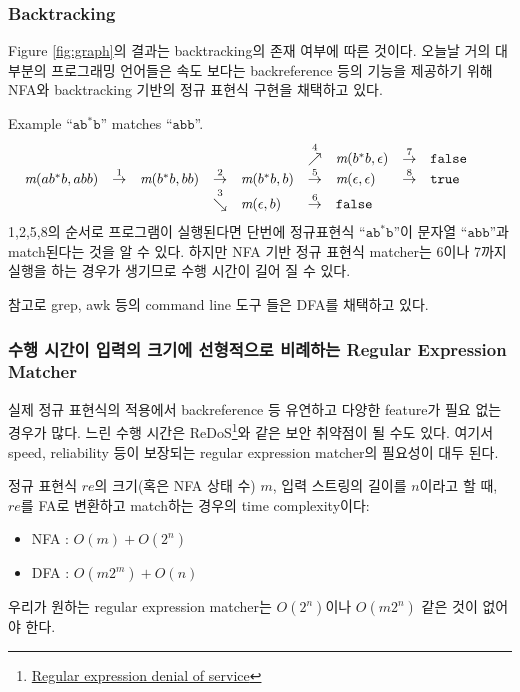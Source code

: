 \begin{frame}[shrink]
\frametitle{Backtracking}

Figure \ref{fig:graph}의 결과는 backtracking의 존재 여부에 따른 것이다.
오늘날 거의 대부분의 프로그래밍 언어들은 속도 보다는 backreference 등의 기능을 
제공하기 위해 NFA와 backtracking 기반의 정규 표현식 구현을 채택하고
있다.

\begin{block}{Example}
``$\texttt{ab}^{*}\texttt{b}$'' matches ``$\texttt{abb}$''.
\[
  \begin{array}{lllllllllll}
    &   &             &         &             &\stackrel{4}{\nearrow} &
    \rmatch{\e}{b^{*}b}&\stackrel{7}{\ra}& \F &  \\
    \rmatch{abb}{ab^{*}b} &\stackrel{1}{\ra}& \rmatch{bb}{b^{*}b} & \stackrel{2}{\ra}
    & \rmatch{b}{b^{*}b} &\stackrel{5}{\ra}     & \rmatch{\e}{\e}
    &\stackrel{8}{\ra}& \T &  \\
    &   &             & \stackrel{3}{\searrow} & \rmatch{b}{\e}
    &\stackrel{6}{\ra}     & \F  & &  & &   
  \end{array}
\]
1,2,5,8의 순서로 프로그램이 실행된다면 단번에 
정규표현식 ``$\texttt{ab}^{*}\texttt{b}$''이 문자열  ``$\texttt{abb}$''과
match된다는 것을 알 수 있다. 하지만 NFA 기반 정규 표현식 matcher는 6이나 
7까지 실행을 하는 경우가 생기므로 수행 시간이 길어 질 수 있다.
\end{block}

참고로 grep, awk 등의 command line 도구 들은 DFA를 채택하고 있다.

\end{frame}

\begin{frame}
\frametitle{수행 시간이 입력의 크기에 선형적으로 비례하는 Regular Expression Matcher}

실제 정규 표현식의 적용에서 backreference 등 유연하고 
다양한 feature가 필요 없는 경우가 많다. 
느린 수행 시간은 ReDoS\footnote{\href{http://en.wikipedia.org/wiki/ReDos}{Regular expression denial of service}}와 
같은 보안 취약점이 될 수도 있다.
여기서 speed, reliability 등이 보장되는 regular expression matcher의 
필요성이 대두 된다. 

정규 표현식 $re$의 크기(혹은 NFA 상태 수) $m$, 
입력 스트링의 길이를 $n$이라고 할 때, $re$를 FA로 변환하고 match하는 경우의
time complexity이다:

\begin{itemize}
\item NFA : $O(m) + O(2^n)$
\item DFA : $O(m2^m) + O(n)$
\end{itemize}

우리가 원하는 regular expression matcher는 $O(2^n)$이나 $O(m2^n)$ 같은 것이
없어야 한다.
\end{frame}
